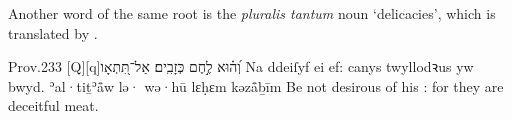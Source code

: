 
\begin{paper}
	Another word of the same root is the \textit{pluralis tantum} noun  ‘delicacies’, which is translated by .
\end{paper}

\begin{example}{Prov.}{23}{3}{}{}
	\quoling
	{אַל־תִּ֭תְאָו‪[Q]‬‪[q]‬  וְ֝ה֗וּא לֶ֣חֶם כְּזָבִֽים׃}
	{Na ddeiſyf ei  ef: canys twyllodꝛus yw bwyd.}
	{ʾal·tiṯʾå̄w lə· wə·hū lɛḥɛm kəzå̄ḇīm}
	{Be not desirous of his : for they are deceitful meat.}
\end{example}
